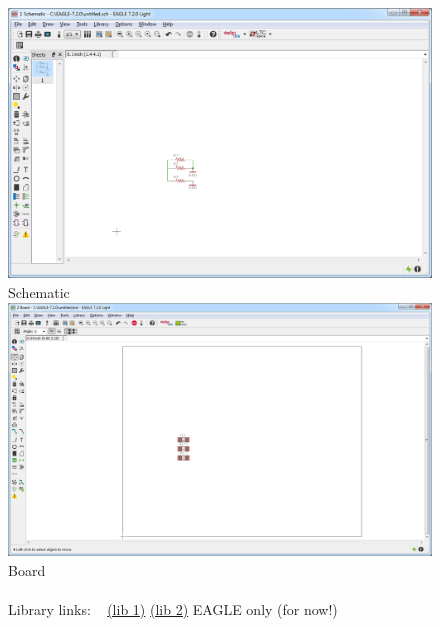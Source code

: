 \documentclass{beamer}
\begin{document}
\begin{frame}
\begin{columns}[t]
\begin{figure}
  \centering
  \includegraphics[width=0.8\columnwidth]{images-dis2/eagle-schematic} \\
  Schematic \\
  \includegraphics[width=0.8\columnwidth]{images-dis2/eagle-board} \\
  Board \\
  \hfill \\
  Library links: \
  {\tiny
  \href{http://www-inst.eecs.berkeley.edu/~ee192/sp15/files/ee192.lbr}{(lib 1)}
  \href{http://www-inst.eecs.berkeley.edu/~ee192/sp15/files/natcar.lbr}{(lib 2)}
  }
  {\tiny EAGLE only (for now!)}
\end{figure}
\end{columns}
\end{frame}
\end{document}
